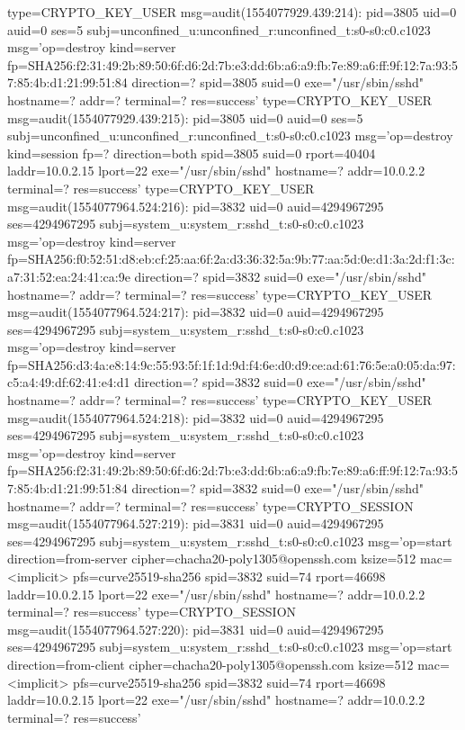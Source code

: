 \documentclass[]{report}
\newenvironment{Shaded}{}{}
\newcommand{\NormalTok}[1]{#1}
\begin{document}
\begin{Shaded}
\begin{Highlighting}[]
\NormalTok{type=CRYPTO_KEY_USER msg=audit(1554077929.439:214): pid=3805 uid=0 auid=0 ses=5 subj=unconfined_u:unconfined_r:unconfined_t:s0-s0:c0.c1023 msg='op=destroy kind=server fp=SHA256:f2:31:49:2b:89:50:6f:d6:2d:7b:e3:dd:6b:a6:a9:fb:7e:89:a6:ff:9f:12:7a:93:57:85:4b:d1:21:99:51:84 direction=? spid=3805 suid=0  exe="/usr/sbin/sshd" hostname=? addr=? terminal=? res=success'}
\NormalTok{type=CRYPTO_KEY_USER msg=audit(1554077929.439:215): pid=3805 uid=0 auid=0 ses=5 subj=unconfined_u:unconfined_r:unconfined_t:s0-s0:c0.c1023 msg='op=destroy kind=session fp=? direction=both spid=3805 suid=0 rport=40404 laddr=10.0.2.15 lport=22  exe="/usr/sbin/sshd" hostname=? addr=10.0.2.2 terminal=? res=success'}
\NormalTok{type=CRYPTO_KEY_USER msg=audit(1554077964.524:216): pid=3832 uid=0 auid=4294967295 ses=4294967295 subj=system_u:system_r:sshd_t:s0-s0:c0.c1023 msg='op=destroy kind=server fp=SHA256:f0:52:51:d8:eb:cf:25:aa:6f:2a:d3:36:32:5a:9b:77:aa:5d:0e:d1:3a:2d:f1:3c:a7:31:52:ea:24:41:ca:9e direction=? spid=3832 suid=0  exe="/usr/sbin/sshd" hostname=? addr=? terminal=? res=success'}
\NormalTok{type=CRYPTO_KEY_USER msg=audit(1554077964.524:217): pid=3832 uid=0 auid=4294967295 ses=4294967295 subj=system_u:system_r:sshd_t:s0-s0:c0.c1023 msg='op=destroy kind=server fp=SHA256:d3:4a:e8:14:9c:55:93:5f:1f:1d:9d:f4:6e:d0:d9:ce:ad:61:76:5e:a0:05:da:97:c5:a4:49:df:62:41:e4:d1 direction=? spid=3832 suid=0  exe="/usr/sbin/sshd" hostname=? addr=? terminal=? res=success'}
\NormalTok{type=CRYPTO_KEY_USER msg=audit(1554077964.524:218): pid=3832 uid=0 auid=4294967295 ses=4294967295 subj=system_u:system_r:sshd_t:s0-s0:c0.c1023 msg='op=destroy kind=server fp=SHA256:f2:31:49:2b:89:50:6f:d6:2d:7b:e3:dd:6b:a6:a9:fb:7e:89:a6:ff:9f:12:7a:93:57:85:4b:d1:21:99:51:84 direction=? spid=3832 suid=0  exe="/usr/sbin/sshd" hostname=? addr=? terminal=? res=success'}
\NormalTok{type=CRYPTO_SESSION msg=audit(1554077964.527:219): pid=3831 uid=0 auid=4294967295 ses=4294967295 subj=system_u:system_r:sshd_t:s0-s0:c0.c1023 msg='op=start direction=from-server cipher=chacha20-poly1305@openssh.com ksize=512 mac=<implicit> pfs=curve25519-sha256 spid=3832 suid=74 rport=46698 laddr=10.0.2.15 lport=22  exe="/usr/sbin/sshd" hostname=? addr=10.0.2.2 terminal=? res=success'}
\NormalTok{type=CRYPTO_SESSION msg=audit(1554077964.527:220): pid=3831 uid=0 auid=4294967295 ses=4294967295 subj=system_u:system_r:sshd_t:s0-s0:c0.c1023 msg='op=start direction=from-client cipher=chacha20-poly1305@openssh.com ksize=512 mac=<implicit> pfs=curve25519-sha256 spid=3832 suid=74 rport=46698 laddr=10.0.2.15 lport=22  exe="/usr/sbin/sshd" hostname=? addr=10.0.2.2 terminal=? res=success'}

\end{Highlighting}
\end{Shaded}
\end{document}
